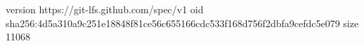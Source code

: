 version https://git-lfs.github.com/spec/v1
oid sha256:4d5a310a9c251e18848f81ce56c655166cdc533f168d756f2dbfa9cefdc5e079
size 11068
